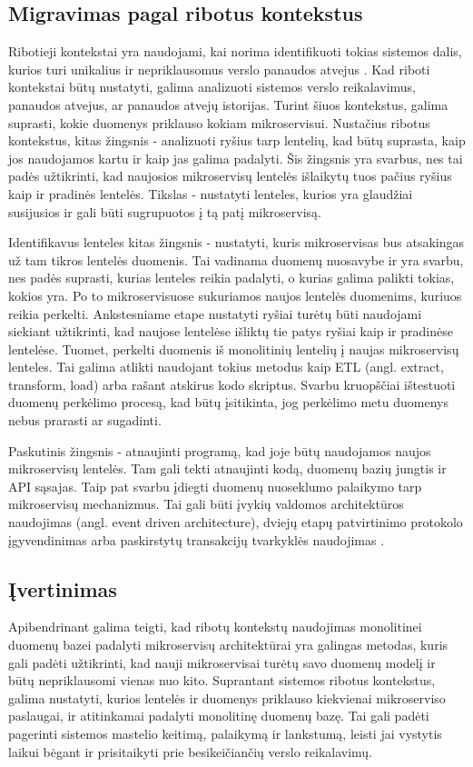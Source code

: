 \documentclass[fleqn]{VUMIFPSkursinis}
\begin{document}
\subsection{Migravimas pagal ribotus kontekstus}
Ribotieji kontekstai yra naudojami, kai norima identifikuoti tokias sistemos dalis, kurios turi unikalius ir nepriklausomus verslo panaudos atvejus \cite{New19}. Kad riboti kontekstai būtų nustatyti, galima analizuoti sistemos verslo reikalavimus, panaudos atvejus, ar panaudos atvejų istorijas. Turint šiuos kontekstus, galima suprasti, kokie duomenys priklauso kokiam mikroservisui. Nustačius ribotus kontekstus, kitas žingsnis - analizuoti ryšius tarp lentelių, kad būtų suprasta, kaip jos naudojamos kartu ir kaip jas galima padalyti. Šis žingsnis yra  svarbus, nes tai padės užtikrinti, kad naujosios mikroservisų lentelės išlaikytų tuos pačius ryšius kaip ir pradinės lentelės. Tikslas - nustatyti lenteles, kurios yra glaudžiai susijusios ir gali būti sugrupuotos į tą patį mikroservisą.

Identifikavus lenteles kitas žingsnis - nustatyti, kuris mikroservisas bus atsakingas už tam tikros lentelės duomenis. Tai vadinama duomenų nuosavybe ir yra svarbu, nes padės suprasti, kurias lenteles reikia padalyti, o kurias galima palikti tokias, kokios yra. Po to mikroservisuose sukuriamos naujos lentelės duomenims, kuriuos reikia perkelti. Ankstesniame etape nustatyti ryšiai turėtų būti naudojami siekiant užtikrinti, kad naujose lentelėse išliktų tie patys ryšiai kaip ir pradinėse lentelėse. Tuomet, perkelti duomenis iš monolitinių lentelių į naujas mikroservisų lenteles. Tai galima atlikti naudojant tokius metodus kaip ETL (angl. extract, transform, load) \cite{LRZ+21} arba rašant atskirus kodo skriptus. Svarbu kruopščiai ištestuoti duomenų perkėlimo procesą, kad būtų įsitikinta, jog perkėlimo metu duomenys nebus prarasti ar sugadinti.

Paskutinis žingsnis - atnaujinti programą, kad joje būtų naudojamos naujos mikroservisų lentelės. Tam gali tekti atnaujinti kodą, duomenų bazių jungtis ir API sąsajas. Taip pat svarbu įdiegti duomenų nuoseklumo palaikymo tarp mikroservisų mechanizmus. Tai gali būti įvykių valdomos architektūros naudojimas (angl. event driven architecture), dviejų etapų patvirtinimo protokolo įgyvendinimas arba paskirstytų transakcijų tvarkyklės naudojimas \cite{New19}.

\subsection{Įvertinimas}
Apibendrinant galima teigti, kad ribotų kontekstų naudojimas monolitinei duomenų bazei padalyti mikroservisų architektūrai yra galingas metodas, kuris gali padėti užtikrinti, kad nauji mikroservisai turėtų savo duomenų modelį ir būtų nepriklausomi vienas nuo kito. Suprantant sistemos ribotus kontekstus, galima nustatyti, kurios lentelės ir duomenys priklauso kiekvienai mikroserviso paslaugai, ir atitinkamai padalyti monolitinę duomenų bazę. Tai gali padėti pagerinti sistemos mastelio keitimą, palaikymą ir lankstumą, leisti jai vystytis laikui bėgant ir prisitaikyti prie besikeičiančių verslo reikalavimų.
\end{document}
